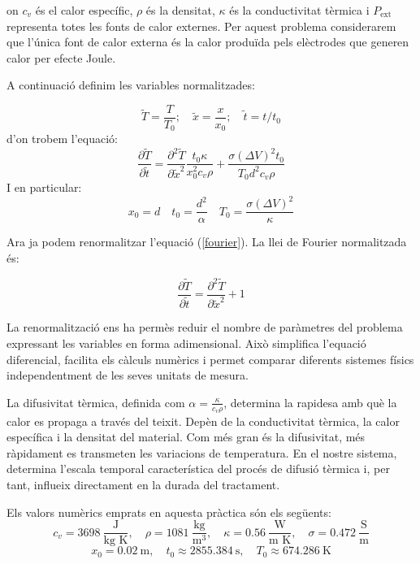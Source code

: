 \documentclass[a4paper,11pt,oneside]{article}
\begin{document}
on $c_v$ és el calor específic, $\rho$ és la densitat, $\kappa$ és la conductivitat tèrmica i $P_{\text{ext}}$ representa totes 
les fonts de calor externes. Per aquest problema considerarem que l'única font de calor externa és la calor produïda pels 
elèctrodes que generen calor per efecte Joule.

A continuació definim les variables normalitzades:

\begin{equation}
    \widetilde{T}=\frac{T}{T_0};\quad \widetilde{x}=\frac{x}{x_0};\quad \widetilde{t}=t/t_0
    \label{norm}
\end{equation}
d'on trobem l'equació:
\begin{equation*}
    \frac{\partial \widetilde{T}}{\partial \widetilde{t}} = \frac{\partial^2 \widetilde{T}}{\partial \widetilde{x}^2}  
    \frac{t_0\kappa}{x_0^2c_v\rho}+\frac{\sigma (\Delta V)^2t_0}{T_0d^2c_v\rho}
\end{equation*}
I en particular:
 \begin{equation}
     x_0=d \quad t_0=\frac{d^2}{\alpha} \quad T_0=\frac{\sigma (\Delta V)^2}{\kappa}
\end{equation}

Ara ja podem renormalitzar l'equació (\ref{fourier}). La llei de Fourier normalitzada és:

\begin{equation}
    \frac{\partial \widetilde{T}}{\partial \widetilde{t}}=\frac{\partial^2 \widetilde{T}}{\partial \widetilde{x}^2} + 1
    \label{fouriernorm}
\end{equation}

La renormalització ens ha permès reduir el nombre de paràmetres del problema expressant les variables en forma adimensional. Això 
simplifica l'equació diferencial, facilita els càlculs numèrics i permet comparar diferents sistemes físics independentment de 
les seves unitats de mesura.

La difusivitat tèrmica, definida com $\alpha=\frac{\kappa}{c_v\rho}$, determina la rapidesa amb què la calor es propaga a través 
del teixit. Depèn de la conductivitat tèrmica, la calor específica i la densitat del material. Com més gran és la difusivitat, 
més ràpidament es transmeten les variacions de temperatura. En el nostre sistema, determina l'escala temporal característica del 
procés de difusió tèrmica i, per tant, influeix directament en la durada del tractament.

Els valors numèrics emprats en aquesta pràctica són els següents: 
\begin{equation*}
    c_v = 3698 \ \frac{\text{J}}{\text{kg \ K}}, \quad \rho = 1081 \ \frac{\text{kg}}{\text{m} ^3}, \quad \kappa = 0.56 \ \frac{\text{W}}{\text{m \ K}}, \quad \sigma = 0.472 \ \frac{\text{S}}{\text{m}}
\end{equation*}
\begin{equation*}
    x_0 = 0.02 \ \text{m}, \quad t_0 \approx 2855.384 \ \text{s}, \quad T_0 \approx 674.286 \ \text{K}
\end{equation*}
\end{document}
